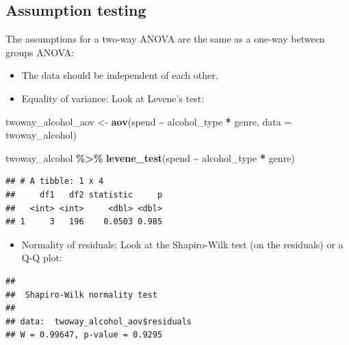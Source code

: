 \documentclass[
]{book}
\newenvironment{Shaded}{\begin{snugshade}}{\end{snugshade}}
\newcommand{\AttributeTok}[1]{\textcolor[rgb]{0.13,0.29,0.53}{#1}}
\newcommand{\FunctionTok}[1]{\textcolor[rgb]{0.13,0.29,0.53}{\textbf{#1}}}
\newcommand{\NormalTok}[1]{#1}
\newcommand{\OtherTok}[1]{\textcolor[rgb]{0.56,0.35,0.01}{#1}}
\newcommand{\SpecialCharTok}[1]{\textcolor[rgb]{0.81,0.36,0.00}{\textbf{#1}}}
\providecommand{\tightlist}{%
  \setlength{\itemsep}{0pt}\setlength{\parskip}{0pt}}
\begin{document}
\hypertarget{assumption-testing}{%
\subsection{Assumption testing}\label{assumption-testing}}

The assumptions for a two-way ANOVA are the same as a one-way between groups ANOVA:

\begin{itemize}
\tightlist
\item
  The data should be independent of each other.
\item
  Equality of variance: Look at Levene's test:
\end{itemize}

\begin{Shaded}
\begin{Highlighting}[]
\NormalTok{twoway\_alcohol\_aov }\OtherTok{\textless{}{-}} \FunctionTok{aov}\NormalTok{(spend }\SpecialCharTok{\textasciitilde{}}\NormalTok{ alcohol\_type }\SpecialCharTok{*}\NormalTok{ genre, }\AttributeTok{data =}\NormalTok{ twoway\_alcohol)}

\NormalTok{twoway\_alcohol }\SpecialCharTok{\%\textgreater{}\%}
  \FunctionTok{levene\_test}\NormalTok{(spend }\SpecialCharTok{\textasciitilde{}}\NormalTok{ alcohol\_type }\SpecialCharTok{*}\NormalTok{ genre)}
\end{Highlighting}
\end{Shaded}

\begin{verbatim}
## # A tibble: 1 x 4
##     df1   df2 statistic     p
##   <int> <int>     <dbl> <dbl>
## 1     3   196    0.0503 0.985
\end{verbatim}

\begin{itemize}
\tightlist
\item
  Normality of residuals: Look at the Shapiro-Wilk test (on the residuals) or a Q-Q plot:
\end{itemize}

\begin{Shaded}
\end{Shaded}

\begin{verbatim}
## 
##  Shapiro-Wilk normality test
## 
## data:  twoway_alcohol_aov$residuals
## W = 0.99647, p-value = 0.9295
\end{verbatim}
\end{document}
